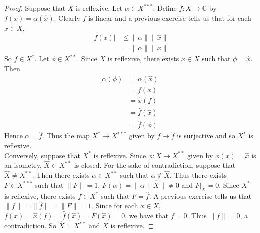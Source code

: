 \documentclass[12pt]{amsart}
\theoremstyle{definition}
\newcommand{\al}{\alpha}
\newcommand{\C}{\mathbb{C}}
\begin{document}
	\begin{proof}
		Suppose that $X$ is reflexive. Let $\al \in X^{***}$. Define $f :X \rightarrow \C$ by $f(x) = \al(\hat{x})$. Clearly $f$ is linear and a previous exercise tells us that for each $x \in X$, 
		\begin{align*}
			\vert f(x) \vert 
			& \leq \|\al \|\|\hat{x} \|\\
			&= \|\al \|\|x \|
		\end{align*}
		So $f \in X^*$.
		Let $\phi \in X^{**}$. Since $X$ is reflexive, there exists $x \in X$ such that $\phi = \hat{x}$. Then 
		\begin{align*}
			\al(\phi)
			&= \al(\hat{x})\\
			&= f(x)\\
			&= \hat{x}(f)\\
			&= \hat{f}(\hat{x})\\
			&= \hat{f}(\phi)
		\end{align*}
		Hence $\al = \hat{f}$. Thus the map $X^* \rightarrow X^{***}$ given by $f \mapsto \hat{f} $ is surjective and so $X^{*}$ is reflexive.\vspace{.5cm}\\
		Conversely, suppose that $X^*$ is reflexive. Since $\phi:X \rightarrow X^{**}$ given by $\phi(x) = \hat{x}$ is an isometry, $\widehat{X} \subset X^{**}$ is closed. For the sake of contradiction, suppose that $\widehat{X} \neq X^{**}$. Then there exists $\al \in X^{**}$ such that $\al \not \in \widehat{X}$. Thus there exists $F \in X^{***}$ such that $\|F \|= 1$, $F(\al) = \|\al + \widehat{X} \|\neq 0$ and $F|_{\widehat{X}}=0$. Since $X^*$ is reflexive, there exists $f \in X^*$ such that $F = \hat{f}$. A previous exercise tells us that $\|f \|= \|\hat{f} \|= \|F \|= 1$. Since for each $x \in X$, $f(x) = \hat{x}(f) = \hat{f}(\hat{x}) = F(\hat{x}) = 0$, we have that $f = 0$. Thus $\|f \|= 0$, a contradiction. So $\widehat{X} = X^{**}$ and $X$ is reflexive.
		
	\end{proof}
	
	
	
	
	
	
	
	
	
	
	
	
	
	
	
	
	
	
	
	
	
	\newpage
\end{document}
